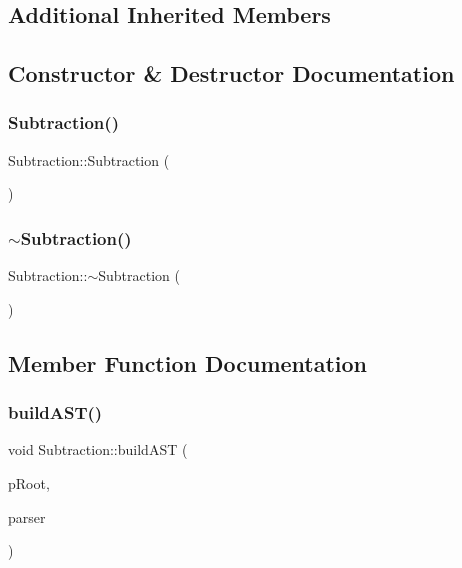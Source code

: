 \subsection*{Additional Inherited Members}


\subsection{Constructor \& Destructor Documentation}
\mbox{\label{class_subtraction_a1c37c16ec1b7f7f89ec57bd749648e71}} 
\subsubsection{\texorpdfstring{Subtraction()}{Subtraction()}}
{\footnotesize\ttfamily Subtraction\+::\+Subtraction (\begin{DoxyParamCaption}{ }\end{DoxyParamCaption})}

\mbox{\label{class_subtraction_a0fc403b3dc90ed529d032f84b7bc331c}} 
\subsubsection{\texorpdfstring{$\sim$Subtraction()}{~Subtraction()}}
{\footnotesize\ttfamily Subtraction\+::$\sim$\+Subtraction (\begin{DoxyParamCaption}{ }\end{DoxyParamCaption})}



\subsection{Member Function Documentation}
\mbox{\label{class_subtraction_a3473b659f19e10c5898c44ef964a1369}} 
\subsubsection{\texorpdfstring{buildAST()}{buildAST()}}
{\footnotesize\ttfamily void Subtraction\+::build\+A\+ST (\begin{DoxyParamCaption}\item[{std\+::unique\+\_\+ptr$<$ \mbox{\hyperlink{class_abstract_expression}{Abstract\+Expression}} $>$ \&}]{p\+Root,  }\item[{\mbox{\hyperlink{class_parser}{Parser}} \&}]{parser }\end{DoxyParamCaption})\hspace{0.3cm}{\ttfamily [virtual]}}



